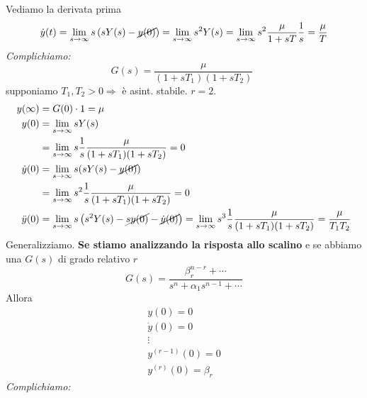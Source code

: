 \documentclass[10pt,a4paper]{book}
\begin{document}
Vediamo la derivata prima
\begin{equation*}
\dot{y}(t) =\lim _{s\rightarrow \infty } s\left( sY(s) -\cancel{y(0)}\right) =\lim _{s\rightarrow \infty } s^2 Y(s) =\lim _{s\rightarrow \infty } s^2\frac{\mu }{1+sT}\frac{1}{s} =\frac{\mu }{T}
\end{equation*}
\textit{Complichiamo:}
\begin{equation*}
G(s)=\frac{\mu }{( 1+sT_1)( 1+sT_2)} \ \ 
\end{equation*}
supponiamo $T_1 ,T_2  >0\Rightarrow $ è asint. stabile. $r=2$.
\begin{equation*}
\begin{aligned}
y(\infty ) & =G(0)\cdot 1=\mu \\
y(0) & =\lim _{s\rightarrow \infty } sY(s)\\
 & =\lim _{s\rightarrow \infty } s\frac{1}{s}\frac{\mu }{( 1+sT_1)( 1+sT_2)} =0\\
\dot{y} (0) & =\lim _{s\rightarrow \infty } s(sY(s)-\cancel{y(0)} )\\
 & =\lim _{s\rightarrow \infty } s^2\frac{1}{s}\frac{\mu }{( 1+sT_1)( 1+sT_2)} =0\\
\ddot{y} (0) & =\lim _{s\rightarrow \infty } s\left( s^2 Y(s)-\cancel{sy(0)} -\cancel{\dot{y} (0)}\right) =\lim _{s\rightarrow \infty } s^3\frac{1}{s}\frac{\mu }{( 1+sT_1)( 1+sT_2)} =\frac{\mu }{T_1 T_2}
\end{aligned}
\end{equation*}
Generalizziamo. \textbf{Se stiamo analizzando la risposta allo scalino} e se abbiamo una $G(s)$ di grado relativo $r$
\begin{equation*}
G(s) =\frac{\beta ^{n-r}_r +\cdots }{s^n +\alpha _1 s^{n-1} +\cdots }
\end{equation*}
Allora
\begin{equation*}
\boxed{
\begin{array}{ c }
y(0) =0\\
\dot{y}(0) =0\\
\vdots \\
y^{( r-1)}(0) =0\\
y^{(r)}(0) =\beta _r
\end{array}
}
\end{equation*}
\textit{Complichiamo:}
\end{document}
